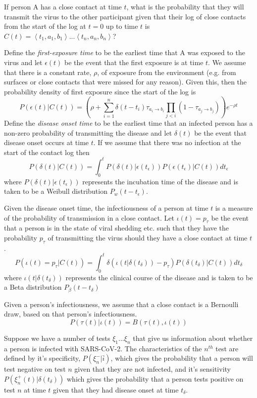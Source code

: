 \documentclass{article}
\begin{document}
If person A has a close contact at time $t$, what is the probability that they will transmit the virus to the other participant given that their log of close contacts from the start of the log at $t=0$ up to time $t$ is $C(t) = \left< t_{1},a_1,b_1 \right> ... \left< t_{n},a_n,b_n \right>$?

Define the \textit{first-exposure time} to be the earliest time that A was exposed to the virus and let $\epsilon(t)$ be the event that the first exposure is at time $t$. We assume that there is a constant rate, $\rho$, of exposure from the environment (e.g. from surfaces or close contacts that were missed for any reason). Given this, then the probability density of first exposure since the start of the log is
\[
P\left(\epsilon(t)|C(t)\right) = \left(\rho + \sum_{i=1}^n \delta(t - t_i)\tau_{a_i\rightarrow b_i} \prod_{j<i}(1-\tau_{a_j\rightarrow b_j})\right) e^{-\rho t}
\] 
Define the \textit{disease onset time} to be the earliest time that an infected person has a non-zero probability of transmitting the disease and let $\delta(t)$ be the event that disease onset occurs at time $t$. If we assume that there was no infection at the start of the contact log then
\[
P(\delta(t)|C(t)) = \int_0^{t} P(\delta(t)|\epsilon(t_\epsilon))P(\epsilon(t_\epsilon)|C(t)) dt_\epsilon
\]
where $P(\delta(t)|\epsilon(t_\epsilon))$ represents the incubation time of the disease and is taken to be a Weibull distribution $P_w(t-t_\epsilon)$.

Given the disease onset time, the infectiousness of a person at time $t$ is a measure of the probability of transmission in a close contact. Let $\iota(t) = p_\tau$ be the event that a person is in the state of viral shedding etc. such that they have the probability $p_\tau$ of transmitting the virus should they have a close contact at time $t$.
\[
P(\iota(t) = p_\tau|C(t)) = \int_0^t \delta(\iota(t|\delta(t_\delta))-p_\tau)P(\delta(t_\delta)|C(t)) dt_\delta
\]
where $\iota(t|\delta(t_\delta))$ represents the clinical course of the disease and is taken to be a Beta distribution $P_\beta(t-t_\delta)$

Given a person's infectiousness, we assume that a close contact is a Bernoulli draw, based on that person's infectiousness.
\[
P(\tau(t)|\iota(t)) = B(\tau(t), \iota(t))
\]

Suppose we have a number of tests $\xi_1...\xi_n$ that give us information about whether a person is infected with SARS-CoV-2. The characteristics of the $n^{th}$ test are defined by it's specificity, $P(\xi^-_n|\bar{i})$, which gives the probability that a person will test negative on test $n$ given that they are not infected, and it's sensitivity $P(\xi^+_n(t)|\delta(t_\delta))$ which gives the probability that a person tests positive on test $n$ at time $t$ given that they had disease onset at time $t_\delta$.
\end{document}
